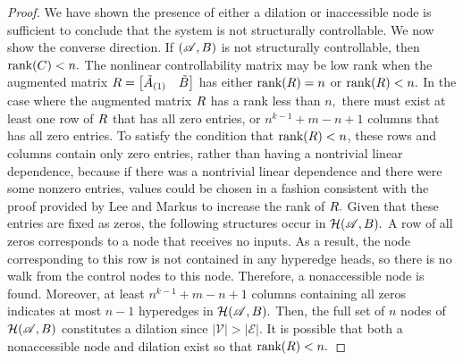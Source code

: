 \documentclass[10pt,a4paper]{amsart}
\newcommand{\Es}{\mathcal{E}}
\newcommand{\Hs}{\mathcal{H}}
\newcommand{\Vs}{\mathcal{V}}
\newcommand{\rank}{\text{rank}}
\begin{document}
\begin{proof}
    
    We have shown the presence of either a dilation or inaccessible node is sufficient to conclude that the system is not structurally controllable. We now show the converse direction. If $(\mathscr A,\textbf B)$ is not structurally controllable, then $\rank(\textbf C) <n.$
    The nonlinear controllability matrix may be low rank when the augmented matrix $\textbf R=\begin{bmatrix}
        \tilde{\textbf A}_{(1)}&\tilde{\textbf B}
    \end{bmatrix}$ has either $\rank(\textbf R)=n$ or $\rank(\textbf R)<n.$
%
    In the case where the augmented matrix $\textbf R$ has a rank less than $n,$ there must exist at least one row of $\textbf R$ that has all zero entries, or $n^{k-1}+m-n+1$ columns that has all zero entries. To satisfy the condition that $\rank(\textbf R)<n$, these rows and columns contain only zero entries, rather than having a nontrivial linear dependence, because if there was a nontrivial linear dependence and there were some nonzero entries, values could be chosen in a fashion consistent with the proof provided by Lee and Markus to increase the rank of $\textbf R.$ Given that these entries are fixed as zeros, the following structures occur in $\Hs(\mathscr A,\textbf B).$ A row of all zeros corresponds to a node that receives no inputs. As a result, the node corresponding to this row is not contained in any hyperedge heads, so there is no walk from the control nodes to this node. Therefore, a nonaccessible node is found. Moreover, at least $n^{k-1}+m-n+1$ columns containing all zeros indicates at most $n-1$ hyperedges in $\Hs(\mathscr A,\textbf B).$ Then, the full set of $n$ nodes of $\Hs(\mathscr A,\textbf B)$ constitutes a dilation since $|\Vs|>|\Es|.$
    It is possible that both a nonaccessible node and dilation exist so that $\rank(\textbf R)<n.$


\end{proof}
\end{document}
